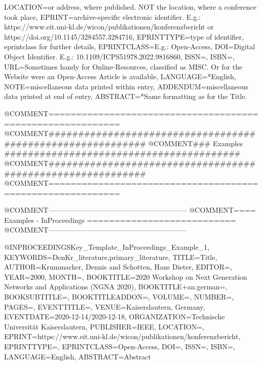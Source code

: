 {	LOCATION={or address, where published. NOT the location, where a conference took place},
	EPRINT={archive-specific electronic identifier. E.g.: https://www.eit.uni-kl.de/wicon/publikationen/konferenzbericht   or   https://doi.org/10.1145/3284557.3284716},
	EPRINTTYPE={type of identifier, eprintclass for further details},
	EPRINTCLASS={E.g.: Open-Access},
	DOI={Digital Object Identifier. E.g.: 10.1109/ICPS51978.2022.9816860},
	ISSN={},
	ISBN={},
	URL={Sometimes handy for Online-Resources, classified as MISC. Or for the Website were an Open-Access Article is available},
	LANGUAGE={*English},
	NOTE={miscellaneous data printed within entry},
	ADDENDUM={miscellaneous data printed at end of entry},
	ABSTRACT={\begingroup
		{*Same formatting as for the Title.}\endgroup}
}












@COMMENT{===========================================================}
@COMMENT{###########################################################}
@COMMENT{###    Examples    ########################################}
@COMMENT{###########################################################}
@COMMENT{===========================================================}


@COMMENT{-----------------------------------------------------------}
@COMMENT{====  Examples - InProceedings  ===========================}
@COMMENT{-----------------------------------------------------------}

@INPROCEEDINGS{Key_Template_InProceedings_Example_1,
	KEYWORDS={DenKr_literature,primary_literature},
	TITLE={\begingroup
		{Title}\endgroup},
	AUTHOR={Krummacker, Dennis and Schotten, Hans Dieter},
	EDITOR={},
	YEAR={2000},
	MONTH={},
	BOOKTITLE={2020 Workshop on Next Generation Networks and Applications (NGNA 2020)},
	BOOKTITLE+an:german={},
	BOOKSUBTITLE={},
	BOOKTITLEADDON={},
	VOLUME={},
	NUMBER={},
	PAGES={},
	EVENTTITLE={},
	VENUE={Kaiserslautern, Germany},
	EVENTDATE={2020-12-14/2020-12-18},
	ORGANIZATION={Technische Universit{\"a}t Kaiserslautern},
	PUBLISHER={IEEE},
	LOCATION={},
	EPRINT={https://www.eit.uni-kl.de/wicon/publikationen/konferenzbericht},
	EPRINTTYPE={},
	EPRINTCLASS={Open-Access},
	DOI={},
	ISSN={},
	ISBN={},
	LANGUAGE={English},
	ABSTRACT={\begingroup
		{Abstract}\endgroup}
}

